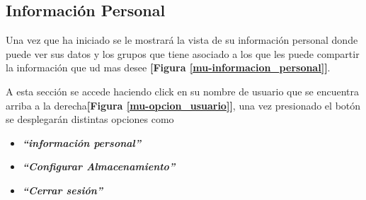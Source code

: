 \subsection{Información Personal} 
Una vez que ha iniciado se le mostrará la vista de su información personal donde puede ver sus datos y los grupos que tiene asociado a los que les puede compartir la información que ud mas desee \textbf{[Figura \ref{mu-informacion_personal}]}. 

A esta sección se accede haciendo click en su nombre de usuario que se encuentra arriba a la derecha\textbf{[Figura \ref{mu-opcion_usuario}]}, una vez presionado el botón se desplegarán distintas opciones como
\begin{itemize}
			\item  	\textbf{\textit{``información personal''	}}
			\item \textbf{\textit{``Configurar Almacenamiento''}}
			\item \textbf{\textit{``Cerrar sesión''}}
\end{itemize}

